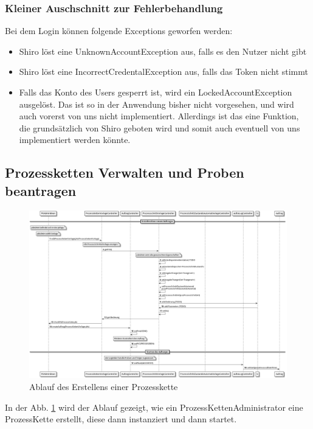 \documentclass[enabledeprecatedfontcommands,fontsize=12pt,paper=a4,twoside]{scrartcl}
\begin{document}
{\subsubsection{Kleiner Auschschnitt zur Fehlerbehandlung}
Bei dem Login können folgende Exceptions geworfen werden:
\begin{itemize}
  \item Shiro löst eine UnknownAccountException aus, falls es den Nutzer nicht gibt
  \item Shiro löst eine IncorrectCredentalException aus, falls das Token nicht
  stimmt
  \item Falls das Konto des Users gesperrt ist, wird ein LockedAccountException
  ausgelöst. Das ist so in der Anwendung bisher nicht vorgesehen, und wird auch vorerst von uns nicht implementiert. Allerdings ist das eine Funktion, die grundsätzlich von Shiro geboten wird und somit auch eventuell von uns implementiert werden könnte.
\end{itemize}

\subsection{Prozessketten Verwalten und Proben beantragen}

\begin{figure}[H]
  \includegraphics[width=\linewidth]{UML/aw/pkErstellen.png}
  \caption{Ablauf des Erstellens einer Prozesskette}
  \label{fig:pkErstellen}
\end{figure}

In der Abb. \ref{fig:pkErstellen} wird der Ablauf gezeigt, wie ein
ProzessKettenAdministrator eine ProzessKette erstellt, diese dann instanziert
und dann startet.

}
\end{document}
